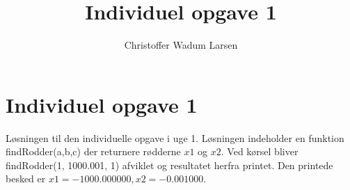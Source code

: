 \documentclass[12pt]{article}
\title{Individuel opgave 1}
\author{Christoffer Wadum Larsen}
\begin{document}
\maketitle

\section{Individuel opgave 1}

Løsningen til den individuelle opgave i uge 1. Løsningen indeholder en funktion findRodder(a,b,c) der returnere rødderne $x1$ og $x2$. Ved kørsel bliver findRodder(1, 1000.001, 1) afviklet og resultatet herfra printet. Den printede besked er $x1 = -1000.000000, x2 = -0.001000$.
\end{document}
